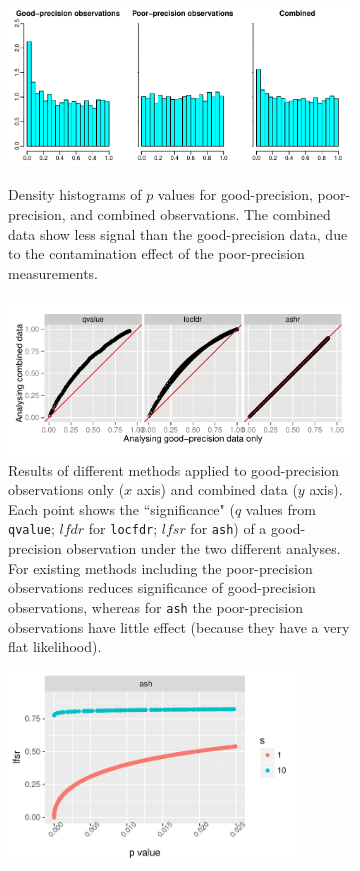 \documentclass[11pt]{article}
\def\lfdr{\textit{lfdr}}
\def\lfsr{\textit{lfsr}}
\def\qvalue{{\tt qvalue}\xspace}
\def\locfdr{{\tt locfdr}\xspace}
\def\ash{{\tt ash}\xspace}
\begin{document}
\begin{figure}[hp!]
\begin{subfigure}{\textwidth}
\centering\includegraphics[width=4in]{../analysis/figure/make_GOODPOOR_figs.Rmd/GOODPOOReg_hist-1.pdf} 
    \label{fig:goodpoor-hist}
    \caption{Density histograms of $p$ values for good-precision, poor-precision, and combined observations. The combined data show less signal than the good-precision data, due to the contamination effect of the poor-precision measurements.}
 \end{subfigure}
\begin{subfigure}{\textwidth}
\centering\includegraphics[width=4in]{../analysis/figure/make_GOODPOOR_figs.Rmd/GOODPOOReg_scatter-1.pdf}
    \caption{Results of different methods applied to good-precision observations only ($x$ axis) and combined data ($y$ axis). Each point shows the ``significance" ($q$ values from \qvalue; $\lfdr$ for \locfdr; $\lfsr$ for \ash) of a good-precision observation under the two different analyses. For existing methods including the poor-precision observations reduces significance of good-precision observations, whereas for \ash the poor-precision observations have little effect (because they have a very flat likelihood).} \label{fig:goodpoor-scatter}
\end{subfigure}
\begin{subfigure}{0.5\textwidth}
\centering\includegraphics[width=3in]{../analysis/figure/make_GOODPOOR_figs.Rmd/lfsr_vs_pval_GOODPOOR_single-2.pdf}

\end{subfigure}
\end{figure}
\end{document}
